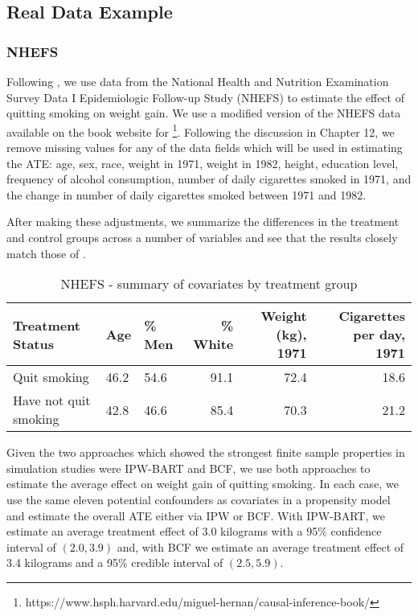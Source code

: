 \documentclass[aos]{imsart}
\begin{document}
\subsection{Real Data Example}

\subsubsection{NHEFS}

Following \cite{hernan2020causal}, we use data from the National Health and Nutrition Examination Survey Data I Epidemiologic Follow-up Study (NHEFS) 
to estimate the effect of quitting smoking on weight gain. 
We use a modified version of the NHEFS data available on the book website for \cite{hernan2020causal}\footnote{https://www.hsph.harvard.edu/miguel-hernan/causal-inference-book/}. 
Following the discussion in Chapter 12, we remove missing values for any of the data fields which will be used in estimating the ATE: age, sex, race, weight in 1971, weight in 1982, height, 
education level, frequency of alcohol consumption, number of daily cigarettes smoked in 1971, and the change in number of daily cigarettes smoked between 1971 and 1982.

After making these adjustments, we summarize the differences in the treatment and control groups across a number of variables and see that the results closely match those of \cite{hernan2020causal}.

\begin{table}[ht]
\centering
\begingroup\small
\begin{tabular}{lllrrr}
  \hline
Treatment Status & Age & \% Men & \% White & Weight (kg), 1971 & Cigarettes per day, 1971 \\ 
  \hline
Quit smoking & 46.2 & 54.6 & 91.1 & 72.4 & 18.6 \\ 
Have not quit smoking & 42.8 & 46.6 & 85.4 & 70.3 & 21.2 \\ 
   \hline
\end{tabular}
\endgroup
\caption{NHEFS - summary of covariates by treatment group} 
\end{table}

Given the two approaches which showed the strongest finite sample properties in simulation studies were IPW-BART and BCF, we use 
both approaches to estimate the average effect on weight gain of quitting smoking.
In each case, we use the same eleven potential confounders as covariates in a propensity model and estimate the overall ATE either via IPW or BCF.
With IPW-BART, we estimate an average treatment effect of 3.0 kilograms with a 95\% confidence interval of $(2.0, 3.9)$ and, with BCF we estimate an 
average treatment effect of 3.4 kilograms and a 95\% credible interval of $(2.5, 5.9)$.
\end{document}
